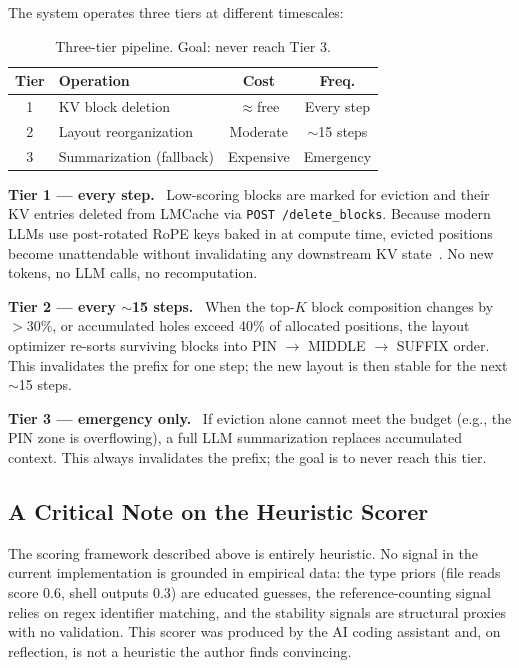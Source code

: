 \documentclass[letterpaper,twocolumn,10pt]{article}
\newcommand{\para}[1]{\smallskip\noindent\textbf{#1.}\ }
\begin{document}
The system operates three tiers at different timescales:

\begin{table}[h]
\centering\small
\setlength{\tabcolsep}{5pt}
\begin{tabular}{clcc}
\toprule
\textbf{Tier} & \textbf{Operation} & \textbf{Cost} & \textbf{Freq.} \\
\midrule
1 & KV block deletion  & $\approx$free & Every step \\
2 & Layout reorganization & Moderate & $\sim$15 steps \\
3 & Summarization (fallback) & Expensive & Emergency \\
\bottomrule
\end{tabular}
\caption{Three-tier pipeline. Goal: never reach Tier 3.}
\label{tab:tiers}
\end{table}

\para{Tier 1 --- every step} Low-scoring blocks are marked for eviction and
their KV entries deleted from LMCache via \texttt{POST /delete\_blocks}.
Because modern LLMs use post-rotated RoPE keys baked in at compute time,
evicted positions become unattendable without invalidating any downstream
KV state~\cite{zhang2023h2o,li2024snapkv}. No new tokens, no LLM calls,
no recomputation.

\para{Tier 2 --- every $\sim$15 steps} When the top-$K$ block composition
changes by $>$30\%, or accumulated holes exceed 40\% of allocated positions,
the layout optimizer re-sorts surviving blocks into PIN $\to$ MIDDLE $\to$
SUFFIX order. This invalidates the prefix for one step; the new layout is
then stable for the next $\sim$15 steps.

\para{Tier 3 --- emergency only} If eviction alone cannot meet the budget
(e.g., the PIN zone is overflowing), a full LLM summarization replaces
accumulated context. This always invalidates the prefix; the goal is to
never reach this tier.

\subsection{A Critical Note on the Heuristic Scorer}

The scoring framework described above is entirely heuristic. No signal in
the current implementation is grounded in empirical data: the type priors
(file reads score 0.6, shell outputs 0.3) are educated guesses, the
reference-counting signal relies on regex identifier matching, and the
stability signals are structural proxies with no validation. This scorer
was produced by the AI coding assistant and, on reflection, is not a
heuristic the author finds convincing.
\end{document}
